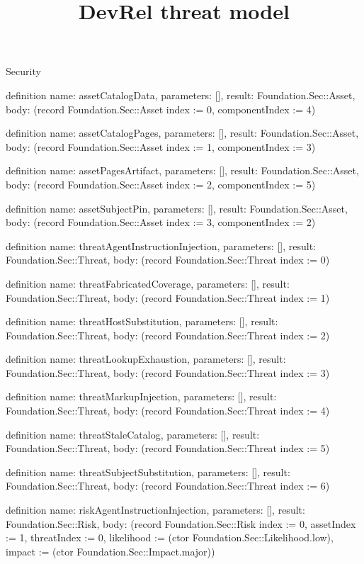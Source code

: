 \begin{lexlean}{Security}
\title{DevRel threat model}
\begin{semanticmodule}
definition{
  name: assetCatalogData,
  parameters: [],
  result: Foundation.Sec::Asset,
  body: (record Foundation.Sec::Asset {index := 0, componentIndex := 4})
}

definition{
  name: assetCatalogPages,
  parameters: [],
  result: Foundation.Sec::Asset,
  body: (record Foundation.Sec::Asset {index := 1, componentIndex := 3})
}

definition{
  name: assetPagesArtifact,
  parameters: [],
  result: Foundation.Sec::Asset,
  body: (record Foundation.Sec::Asset {index := 2, componentIndex := 5})
}

definition{
  name: assetSubjectPin,
  parameters: [],
  result: Foundation.Sec::Asset,
  body: (record Foundation.Sec::Asset {index := 3, componentIndex := 2})
}

definition{
  name: threatAgentInstructionInjection,
  parameters: [],
  result: Foundation.Sec::Threat,
  body: (record Foundation.Sec::Threat {index := 0})
}

definition{
  name: threatFabricatedCoverage,
  parameters: [],
  result: Foundation.Sec::Threat,
  body: (record Foundation.Sec::Threat {index := 1})
}

definition{
  name: threatHostSubstitution,
  parameters: [],
  result: Foundation.Sec::Threat,
  body: (record Foundation.Sec::Threat {index := 2})
}

definition{
  name: threatLookupExhaustion,
  parameters: [],
  result: Foundation.Sec::Threat,
  body: (record Foundation.Sec::Threat {index := 3})
}

definition{
  name: threatMarkupInjection,
  parameters: [],
  result: Foundation.Sec::Threat,
  body: (record Foundation.Sec::Threat {index := 4})
}

definition{
  name: threatStaleCatalog,
  parameters: [],
  result: Foundation.Sec::Threat,
  body: (record Foundation.Sec::Threat {index := 5})
}

definition{
  name: threatSubjectSubstitution,
  parameters: [],
  result: Foundation.Sec::Threat,
  body: (record Foundation.Sec::Threat {index := 6})
}

definition{
  name: riskAgentInstructionInjection,
  parameters: [],
  result: Foundation.Sec::Risk,
  body: (record Foundation.Sec::Risk {index := 0, assetIndex := 1, threatIndex := 0, likelihood := (ctor Foundation.Sec::Likelihood.low), impact := (ctor Foundation.Sec::Impact.major)})
}


\end{semanticmodule}
\end{lexlean}
